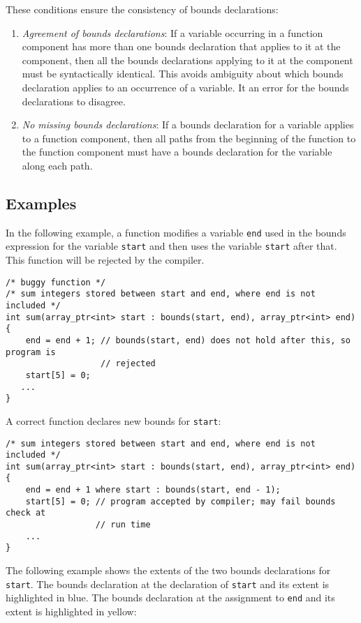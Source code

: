 These conditions ensure the consistency of bounds declarations:

\begin{enumerate}
\item
  \emph{Agreement of bounds declarations}: If a variable occurring in a
  function component has more than one bounds declaration that applies
  to it at the component, then all the bounds declarations applying to
  it at the component must be syntactically identical. This avoids
  ambiguity about which bounds declaration applies to an occurrence of a
  variable. It an error for the bounds declarations to disagree.
\item
  \emph{No missing bounds declarations}: If a bounds declaration for a
  variable applies to a function component, then all paths from the
  beginning of the function to the function component must have a bounds
  declaration for the variable along each path.
\end{enumerate}

\subsection{Examples}
\label{examples:consistency}

In the following example, a function modifies a variable \texttt{end}
used in the bounds expression for the variable \texttt{start} and then
uses the variable \texttt{start} after that. This function will be
rejected by the compiler.

\begin{verbatim}
/* buggy function */
/* sum integers stored between start and end, where end is not included */
int sum(array_ptr<int> start : bounds(start, end), array_ptr<int> end)
{ 
    end = end + 1; // bounds(start, end) does not hold after this, so program is
                   // rejected
    start[5] = 0;
   ...
}
\end{verbatim}

A correct function declares new bounds for \texttt{start}:

\begin{verbatim}
/* sum integers stored between start and end, where end is not included */
int sum(array_ptr<int> start : bounds(start, end), array_ptr<int> end)
{ 
    end = end + 1 where start : bounds(start, end - 1);
    start[5] = 0; // program accepted by compiler; may fail bounds check at 
                  // run time
    ...
}
\end{verbatim}

The following example shows the extents of the two bounds declarations for
\texttt{start}.  The bounds declaration at the declaration of \texttt{start} and 
its extent is highlighted in blue. The bounds declaration at the assignment 
to \texttt{end} and its extent is highlighted in yellow:

